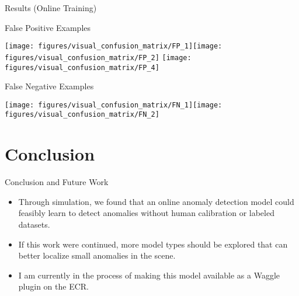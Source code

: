 \documentclass[10pt]{beamer}
\begin{document}
\begin{frame}{Results (Online Training)}

\begin{exampleblock}{False Positive Examples}

\texttt{[image: figures/visual\_confusion\_matrix/FP\_1]}\texttt{[image: figures/visual\_confusion\_matrix/FP\_2]} \texttt{[image: figures/visual\_confusion\_matrix/FP\_4]}

\end{exampleblock}

\begin{exampleblock}{False Negative Examples}

\texttt{[image: figures/visual\_confusion\_matrix/FN\_1]}\texttt{[image: figures/visual\_confusion\_matrix/FN\_2]}

\end{exampleblock}

\end{frame}

\section{Conclusion}
\begin{frame}{Conclusion and Future Work}
\begin{itemize}

\item Through simulation, we found that an online anomaly detection model could feasibly learn to detect anomalies without human calibration or labeled datasets.\\[2mm]

\item If this work were continued, more model types should be explored that can better localize small anomalies in the scene.\\[2mm]

\item I am currently in the process of making this model available as a Waggle plugin on the ECR.

\end{itemize}
\end{frame}

%
%
%
%
%
%
%
%
\end{document}
